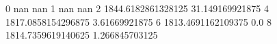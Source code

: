0 nan nan
1 nan nan
2 1844.6182861328125 31.149169921875
4 1817.0858154296875 3.61669921875
6 1813.4691162109375 0.0
8 1814.7359619140625 1.266845703125
